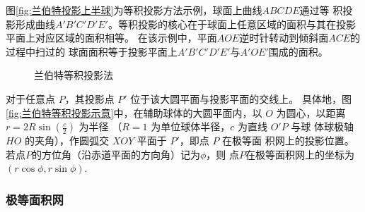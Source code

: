 \documentclass[a4paper,twoside]{ctexart}
\begin{document}
图\ref{fig:兰伯特投影上半球}为等积投影方法示例，球面上曲线$ABCDE$通过等
积投
影形成曲线$A'B'C'D'E'$。等积投影的核心在于球面上任意区域的面积与其在投影
平面上对应区域的面积相等。
在该示例中，平面$AOE$逆时针转动到倾斜面$ACE$的过程中扫过的
球面面积等于投影平面上$A'B'C'D'E'$与$A'OE'$围成的面积。

  \begin{figure}[htbp]
  \centering
  \hspace{1cm}
  
  \caption{兰伯特等积投影法}
  \label{fig:兰伯特等积投影法}
\end{figure}

对于任意点 $P$，其投影点 $P'$ 位于该大圆平面与投影平面的交线上。
具体地，图\ref{fig:兰伯特等积投影示意}中，在辅助球体的大圆平面内，以
$O$ 为圆心，以距离 $r = 2R\sin(\frac{c}{2})$ 为半径
（$R = 1$ 为单位球体半径，$c$ 为直线 $O'P$ 与球
体球极轴 $HO$ 的夹角），作圆弧交 $XOY$ 平面于 $P'$，即点 $P$ 在极等面
积网上的投影位置。 若点$P$的方位角（沿赤道平面的方向角）记为$\phi$，则
点$P$在极等面积网上的坐标为$(r\cos\phi, r\sin\phi)$.


\subsubsection{极等面积网}
\end{document}
